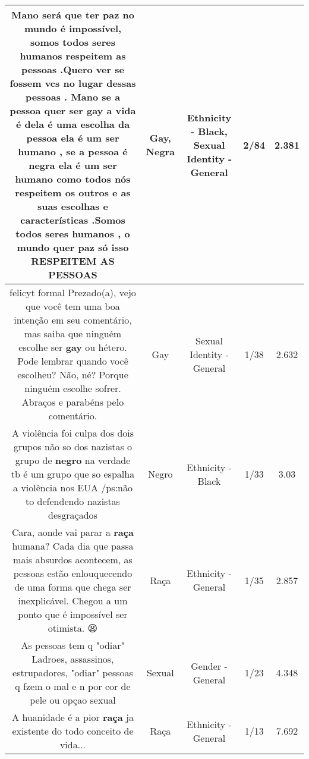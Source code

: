 \documentclass[11pt]{article}
\newlength\mylength
\begin{document}
\begin{center}
\begin{longtable}{|C{.65\mylength}|C{.30\mylength}|C{.12\mylength}|C{.12\mylength}|C{.12\mylength}|}
  \small Mano será que ter paz no mundo é impossível, somos todos seres humanos respeitem as pessoas .Quero ver se fossem vcs no lugar dessas pessoas . Mano se a pessoa quer ser \textbf{gay} a vida é dela é uma escolha da pessoa ela é um ser humano  , se a pessoa é \textbf{negra} ela é um ser humano como todos nós respeitem os outros e as suas escolhas e características  .Somos todos seres humanos , o mundo quer paz só isso RESPEITEM AS PESSOAS\normalsize   & Gay, Negra & Ethnicity - Black, Sexual Identity - General & 2/84 & 2.381 \\  \hline
  \small felicyt formal Prezado(a), vejo que você tem uma boa intenção em seu comentário, mas saiba que ninguém escolhe ser \textbf{gay} ou hétero. Pode lembrar quando você escolheu? Não, né? Porque ninguém escolhe sofrer. Abraços e parabéns pelo comentário.\normalsize   & Gay & Sexual Identity - General & 1/38 & 2.632 \\  \hline
  \small A violência foi culpa dos dois grupos não so dos nazistas o grupo de \textbf{negro} na verdade tb é um grupo que so espalha a violência nos EUA /ps:não to defendendo nazistas desgraçados\normalsize   & Negro & Ethnicity - Black & 1/33 & 3.03 \\  \hline
  \small Cara, aonde vai parar a \textbf{raça} humana? Cada dia que passa mais absurdos acontecem, as pessoas estão enlouquecendo de uma forma que chega ser inexplicável. Chegou a um ponto que é impossível ser otimista. 😫\normalsize   & Raça & Ethnicity - General & 1/35 & 2.857 \\  \hline
  \small As pessoas tem q "odiar" Ladroes, assassinos, estrupadores, "odiar" pessoas q fzem o mal e n por cor de pele ou opçao sexual\normalsize   & Sexual & Gender - General & 1/23 & 4.348 \\  \hline
  \small A huanidade é a pior \textbf{raça} ja existente do todo conceito de vida...\normalsize   & Raça & Ethnicity - General & 1/13 & 7.692 \\  \hline

\end{longtable}
\end{center}
\end{document}
